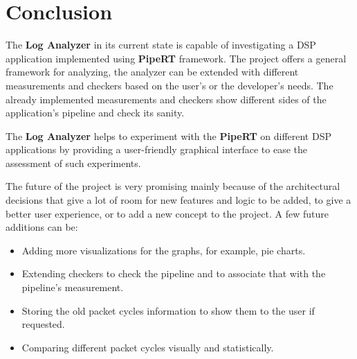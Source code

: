 \chapter{Conclusion} %
\label{ch:sum}
The \textbf{Log Analyzer} in its current state is capable of investigating a DSP application implemented
using \textbf{PipeRT} framework. The project offers a general framework for analyzing, the analyzer
can be extended with different measurements and checkers based on the user's or the developer's needs.
The already implemented measurements and checkers show different sides of the application's pipeline
and check its sanity.

The \textbf{Log Analyzer} helps to experiment with the \textbf{PipeRT} on different DSP applications
by providing a user-friendly graphical interface to ease the assessment of such experiments.

The future of the project is very promising mainly because of the architectural decisions
that give a lot of room for new features and logic to be added, to
give a better user experience, or to add a new concept to the project. A few future additions can be:
\begin{itemize}
    \item Adding more visualizations for the graphs, for example, pie charts.
    \item Extending checkers to check the pipeline and to associate that with the pipeline's measurement.
    \item Storing the old packet cycles information to show them to the user if requested.
    \item Comparing different packet cycles visually and statistically.
\end{itemize}
